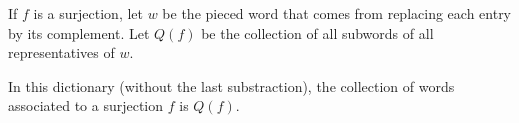 If $f$ is a surjection, let $w$ be the pieced word that comes from replacing each entry by its complement. Let $Q(f)$ be the collection of all subwords of all representatives of $w$.
\begin{lemma} In this dictionary (without the last substraction), the collection of words associated to a surjection $f$ is $Q(f)$.
\end{lemma}